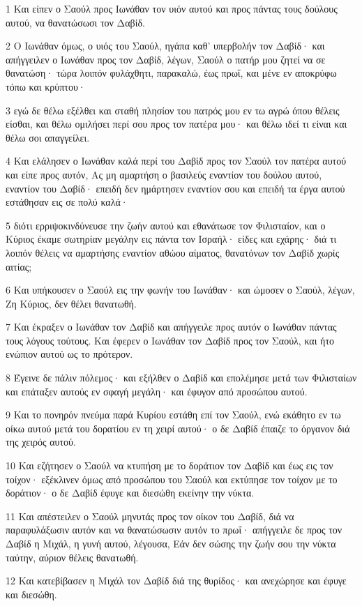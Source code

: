 \par 1 Και είπεν ο Σαούλ προς Ιωνάθαν τον υιόν αυτού και προς πάντας τους δούλους αυτού, να θανατώσωσι τον Δαβίδ.
\par 2 Ο Ιωνάθαν όμως, ο υιός του Σαούλ, ηγάπα καθ' υπερβολήν τον Δαβίδ· και απήγγειλεν ο Ιωνάθαν προς τον Δαβίδ, λέγων, Σαούλ ο πατήρ μου ζητεί να σε θανατώση· τώρα λοιπόν φυλάχθητι, παρακαλώ, έως πρωΐ, και μένε εν αποκρύφω τόπω και κρύπτου·
\par 3 εγώ δε θέλω εξέλθει και σταθή πλησίον του πατρός μου εν τω αγρώ όπου θέλεις είσθαι, και θέλω ομιλήσει περί σου προς τον πατέρα μου· και θέλω ιδεί τι είναι και θέλω σοι απαγγείλει.
\par 4 Και ελάλησεν ο Ιωνάθαν καλά περί του Δαβίδ προς τον Σαούλ τον πατέρα αυτού και είπε προς αυτόν, Ας μη αμαρτήση ο βασιλεύς εναντίον του δούλου αυτού, εναντίον του Δαβίδ· επειδή δεν ημάρτησεν εναντίον σου και επειδή τα έργα αυτού εστάθησαν εις σε πολύ καλά·
\par 5 διότι ερριψοκινδύνευσε την ζωήν αυτού και εθανάτωσε τον Φιλισταίον, και ο Κύριος έκαμε σωτηρίαν μεγάλην εις πάντα τον Ισραήλ· είδες και εχάρης· διά τι λοιπόν θέλεις να αμαρτήσης εναντίον αθώου αίματος, θανατόνων τον Δαβίδ χωρίς αιτίας;
\par 6 Και υπήκουσεν ο Σαούλ εις την φωνήν του Ιωνάθαν· και ώμοσεν ο Σαούλ, λέγων, Ζη Κύριος, δεν θέλει θανατωθή.
\par 7 Και έκραξεν ο Ιωνάθαν τον Δαβίδ και απήγγειλε προς αυτόν ο Ιωνάθαν πάντας τους λόγους τούτους. Και έφερεν ο Ιωνάθαν τον Δαβίδ προς τον Σαούλ, και ήτο ενώπιον αυτού ως το πρότερον.
\par 8 Έγεινε δε πάλιν πόλεμος· και εξήλθεν ο Δαβίδ και επολέμησε μετά των Φιλισταίων και επάταξεν αυτούς εν σφαγή μεγάλη· και έφυγον από προσώπου αυτού.
\par 9 Και το πονηρόν πνεύμα παρά Κυρίου εστάθη επί τον Σαούλ, ενώ εκάθητο εν τω οίκω αυτού μετά του δορατίου εν τη χειρί αυτού· ο δε Δαβίδ έπαιζε το όργανον διά της χειρός αυτού.
\par 10 Και εζήτησεν ο Σαούλ να κτυπήση με το δοράτιον τον Δαβίδ και έως εις τον τοίχον· εξέκλινεν όμως από προσώπου του Σαούλ και εκτύπησε τον τοίχον με το δοράτιον· ο δε Δαβίδ έφυγε και διεσώθη εκείνην την νύκτα.
\par 11 Και απέστειλεν ο Σαούλ μηνυτάς προς τον οίκον του Δαβίδ, διά να παραφυλάξωσιν αυτόν και να θανατώσωσιν αυτόν το πρωΐ· απήγγειλε δε προς τον Δαβίδ η Μιχάλ, η γυνή αυτού, λέγουσα, Εάν δεν σώσης την ζωήν σου την νύκτα ταύτην, αύριον θέλεις θανατωθή.
\par 12 Και κατεβίβασεν η Μιχάλ τον Δαβίδ διά της θυρίδος· και ανεχώρησε και έφυγε και διεσώθη.
